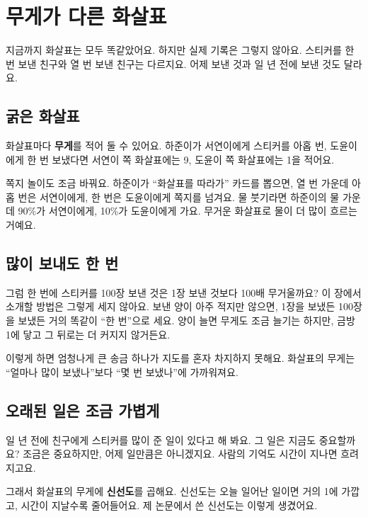 \chapter{무게가 다른 화살표}

지금까지 화살표는 모두 똑같았어요.
하지만 실제 기록은 그렇지 않아요.
스티커를 한 번 보낸 친구와 열 번 보낸 친구는 다르지요.
어제 보낸 것과 일 년 전에 보낸 것도 달라요.

\section{굵은 화살표}

화살표마다 \textbf{무게}를 적어 둘 수 있어요.
하준이가 서연이에게 스티커를 아홉 번, 도윤이에게 한 번 보냈다면
서연이 쪽 화살표에는 9, 도윤이 쪽 화살표에는 1을 적어요.

쪽지 놀이도 조금 바꿔요.
하준이가 “화살표를 따라가” 카드를 뽑으면, 열 번 가운데 아홉 번은 서연이에게, 한 번은 도윤이에게 쪽지를 넘겨요.
물 붓기라면 하준이의 물 가운데 90\%가 서연이에게, 10\%가 도윤이에게 가요.
무거운 화살표로 물이 더 많이 흐르는 거예요.

\section{많이 보내도 한 번}

그럼 한 번에 스티커를 100장 보낸 것은 1장 보낸 것보다 100배 무거울까요?
이 장에서 소개할 방법은 그렇게 세지 않아요.
보낸 양이 아주 적지만 않으면, 1장을 보냈든 100장을 보냈든 거의 똑같이 “한 번”으로 세요.
양이 늘면 무게도 조금 늘기는 하지만, 금방 1에 닿고 그 뒤로는 더 커지지 않거든요.

이렇게 하면 엄청나게 큰 송금 하나가 지도를 혼자 차지하지 못해요.
화살표의 무게는 “얼마나 많이 보냈나”보다 “몇 번 보냈나”에 가까워져요.

\section{오래된 일은 조금 가볍게}

일 년 전에 친구에게 스티커를 많이 준 일이 있다고 해 봐요.
그 일은 지금도 중요할까요?
조금은 중요하지만, 어제 일만큼은 아니겠지요.
사람의 기억도 시간이 지나면 흐려지고요.

그래서 화살표의 무게에 \textbf{신선도}를 곱해요.
신선도는 오늘 일어난 일이면 거의 1에 가깝고, 시간이 지날수록 줄어들어요.
제 논문에서 쓴 신선도는 이렇게 생겼어요.

